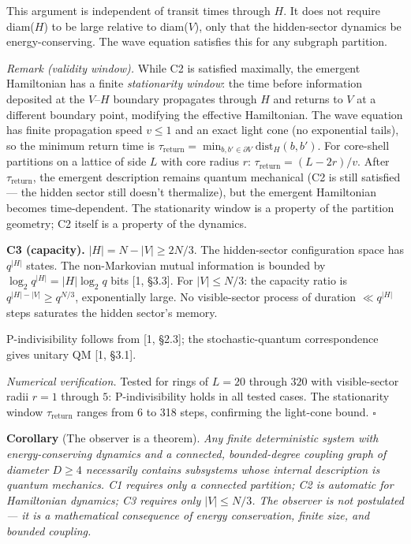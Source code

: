 \documentclass[
  11pt,
]{article}
\begin{document}
This argument is independent of transit times through \(H\). It does not
require diam(\(H\)) to be large relative to diam(\(V\)), only that the
hidden-sector dynamics be energy-conserving. The wave equation satisfies
this for any subgraph partition.

\emph{Remark (validity window).} While C2 is satisfied maximally, the
emergent Hamiltonian has a finite \emph{stationarity window}: the time
before information deposited at the \(V\)--\(H\) boundary propagates
through \(H\) and returns to \(V\) at a different boundary point,
modifying the effective Hamiltonian. The wave equation has finite
propagation speed \(v \leq 1\) and an exact light cone (no exponential
tails), so the minimum return time is
\(\tau_{\mathrm{return}} = \min_{b, b' \in \partial V} \mathrm{dist}_H(b, b')\).
For core-shell partitions on a lattice of side \(L\) with core radius
\(r\): \(\tau_{\mathrm{return}} = (L - 2r)/v\). After
\(\tau_{\mathrm{return}}\), the emergent description remains quantum
mechanical (C2 is still satisfied --- the hidden sector still doesn't
thermalize), but the emergent Hamiltonian becomes time-dependent. The
stationarity window is a property of the partition geometry; C2 itself
is a property of the dynamics.

\textbf{C3 (capacity).} \(|H| = N - |V| \geq 2N/3\). The hidden-sector
configuration space has \(q^{|H|}\) states. The non-Markovian mutual
information is bounded by \(\log_2 q^{|H|} = |H| \log_2 q\) bits {[}1,
§3.3{]}. For \(|V| \leq N/3\): the capacity ratio is
\(q^{|H| - |V|} \geq q^{N/3}\), exponentially large. No visible-sector
process of duration \(\ll q^{|H|}\) steps saturates the hidden sector's
memory.

P-indivisibility follows from {[}1, §2.3{]}; the stochastic-quantum
correspondence gives unitary QM {[}1, §3.1{]}.

\emph{Numerical verification.} Tested for rings of \(L = 20\) through
\(320\) with visible-sector radii \(r = 1\) through \(5\):
P-indivisibility holds in all tested cases. The stationarity window
\(\tau_{\mathrm{return}}\) ranges from 6 to 318 steps, confirming the
light-cone bound. \(\square\)

\textbf{Corollary} (The observer is a theorem). \emph{Any finite
deterministic system with energy-conserving dynamics and a connected,
bounded-degree coupling graph of diameter \(D \geq 4\) necessarily
contains subsystems whose internal description is quantum mechanics. C1
requires only a connected partition; C2 is automatic for Hamiltonian
dynamics; C3 requires only \(|V| \leq N/3\). The observer is not
postulated --- it is a mathematical consequence of energy conservation,
finite size, and bounded coupling.}
\end{document}
